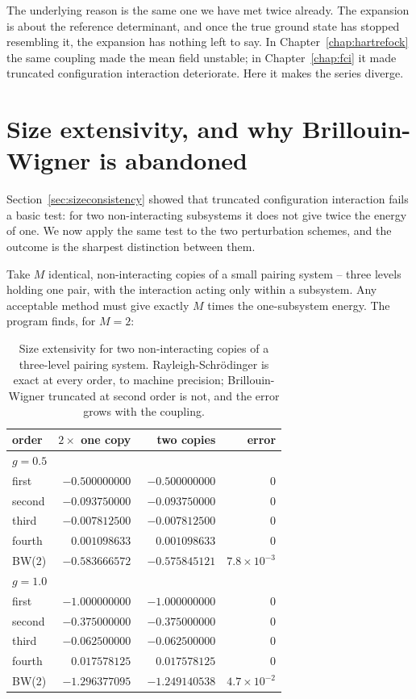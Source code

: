 The underlying reason is the same one we have met twice already.  The
expansion is about the reference determinant, and once the true ground state
has stopped resembling it, the expansion has nothing left to say.  In
Chapter~\ref{chap:hartrefock} the same coupling made the mean field unstable;
in Chapter~\ref{chap:fci} it made truncated configuration interaction
deteriorate.  Here it makes the series diverge.

\section{Size extensivity, and why Brillouin-Wigner is abandoned}
\label{sec:sizeextensivity}

Section~\ref{sec:sizeconsistency} showed that truncated configuration
interaction fails a basic test: for two non-interacting subsystems it does not
give twice the energy of one.  We now apply the same test to the two
perturbation schemes, and the outcome is the sharpest distinction between
them.

Take $M$ identical, non-interacting copies of a small pairing system -- three
levels holding one pair, with the interaction acting only within a subsystem.
Any acceptable method must give exactly $M$ times the one-subsystem energy.
The program finds, for $M=2$:

\begin{table}[h]
\centering
\renewcommand{\arraystretch}{1.25}
\setlength{\tabcolsep}{10pt}
\begin{tabular}{lrrr}
\toprule
order & $2\times$ one copy & two copies & error\\
\midrule
\multicolumn{4}{l}{\emph{$g=0.5$}}\\
first  & $-0.500000000$ & $-0.500000000$ & $0$\\
second & $-0.093750000$ & $-0.093750000$ & $0$\\
third  & $-0.007812500$ & $-0.007812500$ & $0$\\
fourth & $\phantom{-}0.001098633$ & $\phantom{-}0.001098633$ & $0$\\
BW(2)  & $-0.583666572$ & $-0.575845121$ & $7.8\times10^{-3}$\\
\midrule
\multicolumn{4}{l}{\emph{$g=1.0$}}\\
first  & $-1.000000000$ & $-1.000000000$ & $0$\\
second & $-0.375000000$ & $-0.375000000$ & $0$\\
third  & $-0.062500000$ & $-0.062500000$ & $0$\\
fourth & $\phantom{-}0.017578125$ & $\phantom{-}0.017578125$ & $0$\\
BW(2)  & $-1.296377095$ & $-1.249140538$ & $4.7\times10^{-2}$\\
\bottomrule
\end{tabular}
\caption{Size extensivity for two non-interacting copies of a three-level
pairing system.  Rayleigh-Schr\"odinger is exact at every order, to machine
precision; Brillouin-Wigner truncated at second order is not, and the error
grows with the coupling.}
\label{tab:extensivity}
\end{table}

